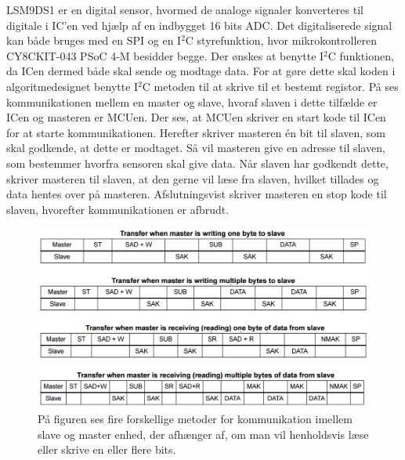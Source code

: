LSM9DS1 er en digital sensor, hvormed de analoge signaler konverteres til digitale i IC'en ved hjælp af en indbygget 16 bits ADC. Det digitaliserede signal kan både bruges med en SPI og en I$^{2}$C styrefunktion, hvor mikrokontrolleren CY8CKIT-043 PSoC 4-M besidder begge. Der ønskes at benytte I$^{2}$C funktionen, da ICen dermed både skal sende og modtage data. For at gøre dette skal koden i algoritmedesignet benytte I$^2$C metoden til at skrive til et bestemt registor. På  ses kommunikationen mellem en master og slave, hvoraf slaven i dette tilfælde er ICen og masteren er MCUen. Der ses, at MCUen skriver en start kode til ICen for at starte kommunikationen. Herefter skriver masteren én bit til slaven, som skal godkende, at dette er modtaget. Så vil masteren give en adresse til slaven, som bestemmer hvorfra sensoren skal give data. Når slaven har godkendt dette, skriver masteren til slaven, at den gerne vil læse fra slaven, hvilket tillades og data hentes over på masteren. Afslutningsvist skriver masteren en stop kode til slaven, hvorefter kommunikationen er afbrudt. %
\begin{figure}[H]
	\centering
	\includegraphics[scale=0.6]{figures/cDesign/Sensor_write_read.png}
	\caption{På figuren ses fire forskellige metoder for kommunikation imellem slave og master enhed, der afhænger af, om man vil henholdsvis læse eller skrive en eller flere bits.\citep{STMicroelectronics2016}}
	\label{Fig:master_slave}
\end{figure}
